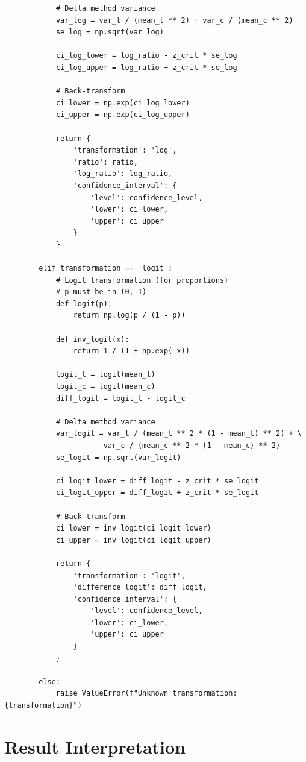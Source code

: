 \begin{lstlisting}
            # Delta method variance
            var_log = var_t / (mean_t ** 2) + var_c / (mean_c ** 2)
            se_log = np.sqrt(var_log)

            ci_log_lower = log_ratio - z_crit * se_log
            ci_log_upper = log_ratio + z_crit * se_log

            # Back-transform
            ci_lower = np.exp(ci_log_lower)
            ci_upper = np.exp(ci_log_upper)

            return {
                'transformation': 'log',
                'ratio': ratio,
                'log_ratio': log_ratio,
                'confidence_interval': {
                    'level': confidence_level,
                    'lower': ci_lower,
                    'upper': ci_upper
                }
            }

        elif transformation == 'logit':
            # Logit transformation (for proportions)
            # p must be in (0, 1)
            def logit(p):
                return np.log(p / (1 - p))

            def inv_logit(x):
                return 1 / (1 + np.exp(-x))

            logit_t = logit(mean_t)
            logit_c = logit(mean_c)
            diff_logit = logit_t - logit_c

            # Delta method variance
            var_logit = var_t / (mean_t ** 2 * (1 - mean_t) ** 2) + \
                       var_c / (mean_c ** 2 * (1 - mean_c) ** 2)
            se_logit = np.sqrt(var_logit)

            ci_logit_lower = diff_logit - z_crit * se_logit
            ci_logit_upper = diff_logit + z_crit * se_logit

            # Back-transform
            ci_lower = inv_logit(ci_logit_lower)
            ci_upper = inv_logit(ci_logit_upper)

            return {
                'transformation': 'logit',
                'difference_logit': diff_logit,
                'confidence_interval': {
                    'level': confidence_level,
                    'lower': ci_lower,
                    'upper': ci_upper
                }
            }

        else:
            raise ValueError(f"Unknown transformation: {transformation}")

\end{lstlisting}

\section{Result Interpretation}

